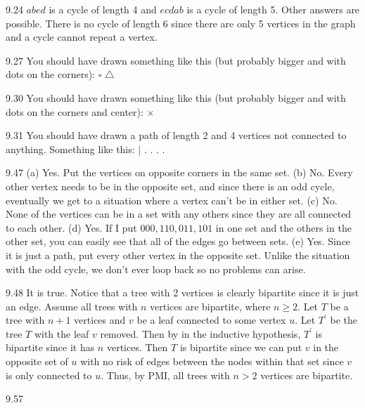 \begin{Answer}{9.24}
$abed$ is a cycle of length 4 and $ecdab$ is a cycle of length 5.
Other answers are possible.
There is no cycle of length 6 since there are only 5 vertices in the graph and a cycle cannot
repeat a vertex.
\end{Answer}
\begin{Answer}{9.27}
You should have drawn something like this (but probably bigger and with dots on the corners): $\square$
$\triangle$
\end{Answer}
\begin{Answer}{9.30}
You should have drawn something like this (but probably bigger and with dots on the corners
and center): $\times$
\end{Answer}
\begin{Answer}{9.31}
You should have drawn a path of length 2 and 4 vertices not connected to anything. Something like this:
 $|$ . . . .
\end{Answer}
\begin{Answer}{9.47}
(a) Yes. Put the vertices on opposite corners in the same
 set.
(b) No. Every other vertex needs to be in the opposite
set, and since there is an odd cycle, eventually
we get to a situation where a vertex can't be in either set.
(c) No. None of the vertices can be in a set with
any others since they are all connected to each other.
(d) Yes. If I put $000, 110, 011, 101$ in one set and
the others in the other set, you can easily
see that all of the edges go between sets.
(e) Yes. Since it is just a path, put every other vertex in
the opposite set. Unlike the situation with the odd cycle,
we don't ever loop back so no problems can arise.
\end{Answer}
\begin{Answer}{9.48}
It is true. Notice that a tree with 2 vertices is clearly
bipartite since it is just an edge.
Assume all trees with $n$ vertices are bipartite,
where $n\geq 2$.
Let $T$ be a tree with $n+1$ vertices and $v$ be a leaf
connected to some vertex $u$.
Let $T^{\prime}$ be the tree $T$ with the leaf $v$ removed. Then by in the inductive hypothesis, $T^{\prime}$ is bipartite since it has $n$ vertices.
Then $T$ is bipartite since we can put $v$ in the
opposite set of $u$ with no risk of edges between
the nodes within that set since
 $v$ is only connected to $u$.
Thus, by PMI, all trees with $n>2$ vertices are bipartite.
\end{Answer}
\begin{Answer}{9.57}

\end{Answer}
